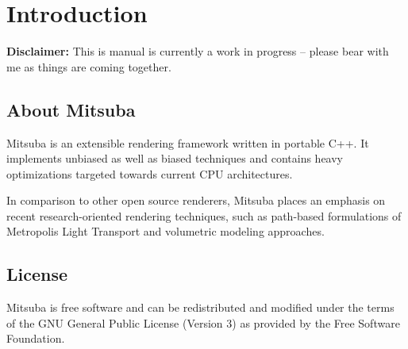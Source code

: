 \section{Introduction}
\textbf{Disclaimer:} This is manual is currently a work in progress --
please bear with me as things are coming together.

\subsection{About Mitsuba}
Mitsuba is an extensible rendering framework written in portable C++. It implements unbiased 
as well as biased techniques and contains heavy optimizations targeted towards current CPU 
architectures.

In comparison to other open source renderers, Mitsuba places an emphasis on recent research-oriented 
rendering techniques, such as path-based formulations of Metropolis Light Transport and volumetric
modeling approaches.

\subsection{License}
Mitsuba is free software and can be redistributed and modified under the terms of the GNU General Public License (Version 3) as provided by the Free Software Foundation.

